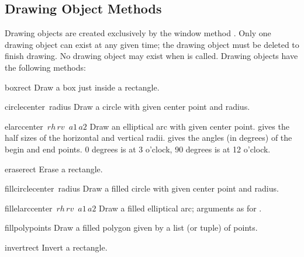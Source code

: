 \subsection{Drawing Object Methods}

Drawing objects are created exclusively by the window method
.
Only one drawing object can exist at any given time; the drawing object
must be deleted to finish drawing.
No drawing object may exist when
is called.
Drawing objects have the following methods:

\renewcommand{\indexsubitem}{(drawing method)}

\begin{funcdesc}{box}{rect}
Draw a box just inside a rectangle.
\end{funcdesc}

\begin{funcdesc}{circle}{center\, radius}
Draw a circle with given center point and radius.
\end{funcdesc}

\begin{funcdesc}{elarc}{center\, \(rh\, rv\)\, \(a1\, a2\)}
Draw an elliptical arc with given center point.
gives the half sizes of the horizontal and vertical radii.
gives the angles (in degrees) of the begin and end points.
0 degrees is at 3 o'clock, 90 degrees is at 12 o'clock.
\end{funcdesc}

\begin{funcdesc}{erase}{rect}
Erase a rectangle.
\end{funcdesc}

\begin{funcdesc}{fillcircle}{center\, radius}
Draw a filled circle with given center point and radius.
\end{funcdesc}

\begin{funcdesc}{fillelarc}{center\, \(rh\, rv\)\, \(a1\, a2\)}
Draw a filled elliptical arc; arguments as for .
\end{funcdesc}

\begin{funcdesc}{fillpoly}{points}
Draw a filled polygon given by a list (or tuple) of points.
\end{funcdesc}

\begin{funcdesc}{invert}{rect}
Invert a rectangle.
\end{funcdesc}

